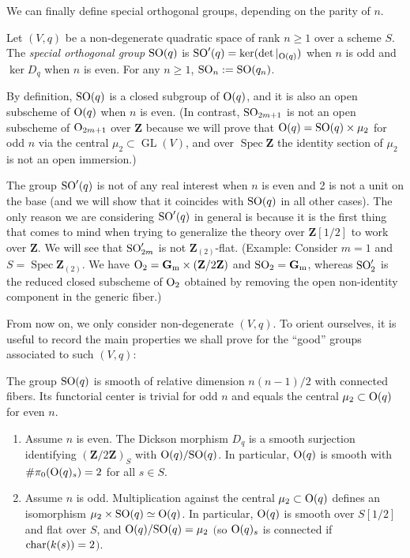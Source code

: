 \documentclass[10pt]{article}
\newcommand{\GL}{\operatorname{GL}}
\renewcommand{\(}{\left(}
\renewcommand{\)}{\right)}
\newcommand{\Spec}{\operatorname{Spec}}
\numberwithin{thm}{subsection}
\begin{document}
We can finally define special orthogonal groups, depending on the parity of $n$.

\begin{defn}\label{soqdef}
Let $(V,q)$ be a non-degenerate quadratic space of rank $n \ge 1$ over a scheme $S$.
The {\em special orthogonal group}
${\rm{SO}}(q)$ is ${\rm{SO}}'(q) = \ker(\det|_{{\rm{O}}(q)})$ when $n$ is odd 
and $\ker D_q$ when $n$ is even. 
For any $n \ge 1$, ${\rm{SO}}_n := {\rm{SO}}(q_n)$.
\end{defn}

By definition, ${\rm{SO}}(q)$ is a closed subgroup of ${\rm{O}}(q)$,
and it is also an open subscheme of ${\rm{O}}(q)$ when $n$ is even.
(In contrast, ${\rm{SO}}_{2m+1}$ is not an open subscheme of ${\rm{O}}_{2m+1}$
over ${\mathbf{Z}}$ because we will prove that ${\rm{O}}(q) = {\rm{SO}}(q) \times \mu_2$ for odd $n$
via the central $\mu_2 \subset \GL(V)$, and over $\Spec {\mathbf{Z}}$ the identity section of $\mu_2$
is not an open immersion.) 
 
 The group ${\rm{SO}}'(q)$ is not of any real interest when $n$ is even and 2 is not a unit
 on the base (and we will show
 that it coincides with ${\rm{SO}}(q)$ in all other cases).  The only reason
 we are considering ${\rm{SO}}'(q)$ 
  in general is because it is the first thing that comes to mind when trying
 to generalize the theory over ${\mathbf{Z}}[1/2]$ to work over ${\mathbf{Z}}$.  We will see
 that ${\rm{SO}}'_{2m}$ is not ${\mathbf{Z}}_{(2)}$-flat.  (Example:
Consider $m = 1$ and $S = \Spec {\mathbf{Z}}_{(2)}$.  We
 have ${\rm{O}}_2 = {\mathbf{G}}_{\rm{m}} \times ({\mathbf{Z}}/2{\mathbf{Z}})$
 and ${\rm{SO}}_2 = {\mathbf{G}}_{\rm{m}}$, whereas
 ${\rm{SO}}'_2$ is the reduced closed subscheme of ${\rm{O}}_2$ obtained
 by removing the open non-identity component in the generic fiber.)

From now on, we only consider non-degenerate $(V,q)$.  To orient ourselves, it is useful
 to record the main properties we shall prove for the ``good'' groups associated to such $(V,q)$:
 
 \begin{thm}\label{goodgp}  The group ${\rm{SO}}(q)$ is smooth of
 relative dimension $n(n-1)/2$ with connected fibers. Its functorial
 center is trivial for odd $n$ and equals the central $\mu_2 \subset {\rm{O}}(q)$
 for even $n$.  
 \begin{enumerate}
 \item Assume $n$ is even.  The
 Dickson morphism
 $D_q$ is a smooth surjection identifying $({\mathbf{Z}}/2{\mathbf{Z}})_S$ with ${\rm{O}}(q)/{\rm{SO}}(q)$.
 In particular, 
${\rm{O}}(q)$ is smooth with $\#\pi_0({\rm{O}}(q)_s) = 2$ for all $s \in S$. 
\item  Assume $n$ is odd. Multiplication against the central $\mu_2 \subset
 {\rm{O}}(q)$ defines an isomorphism $\mu_2 \times {\rm{SO}}(q) \simeq {\rm{O}}(q)$.  
 In particular, ${\rm{O}}(q)$ is smooth over $S[1/2]$ and flat over $S$,
and ${\rm{O}}(q)/{\rm{SO}}(q) = \mu_2$ $($so ${\rm{O}}(q)_s$ is connected if
${\rm{char}}(k(s)) = 2$$)$. 
\end{enumerate}
\end{thm}
\end{document}
